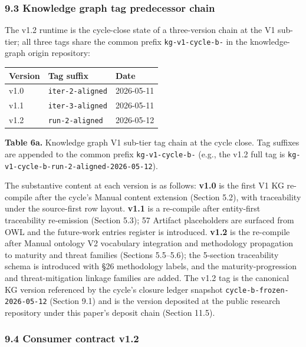 \documentclass[
]{article}
\begin{document}
\subsubsection{9.3 Knowledge graph tag predecessor
chain}\label{knowledge-graph-tag-predecessor-chain}

The v1.2 runtime is the cycle-close state of a three-version chain at
the V1 sub-tier; all three tags share the common prefix
\texttt{kg-v1-cycle-b-} in the knowledge-graph origin repository:

\begin{longtable}[]{@{}lll@{}}
\toprule\noalign{}
Version & Tag suffix & Date \\
\midrule\noalign{}
\endhead
\bottomrule\noalign{}
\endlastfoot
v1.0 & \texttt{iter-2-aligned} & 2026-05-11 \\
v1.1 & \texttt{iter-3-aligned} & 2026-05-11 \\
v1.2 & \texttt{run-2-aligned} & 2026-05-12 \\
\end{longtable}

\textbf{Table 6a.} Knowledge graph V1 sub-tier tag chain at the cycle
close. Tag suffixes are appended to the common prefix
\texttt{kg-v1-cycle-b-} (e.g., the v1.2 full tag is
\texttt{kg-v1-cycle-b-run-2-aligned-2026-05-12}).

The substantive content at each version is as follows: \textbf{v1.0} is
the first V1 KG re-compile after the cycle's Manual content extension
(Section 5.2), with traceability under the source-first row layout.
\textbf{v1.1} is a re-compile after entity-first traceability
re-emission (Section 5.3); 57 Artifact placeholders are surfaced from
OWL and the future-work entries register is introduced. \textbf{v1.2} is
the re-compile after Manual ontology V2 vocabulary integration and
methodology propagation to maturity and threat families (Sections
5.5--5.6); the 5-section traceability schema is introduced with §26
methodology labels, and the maturity-progression and threat-mitigation
linkage families are added. The v1.2 tag is the canonical KG version
referenced by the cycle's closure ledger snapshot
\texttt{cycle-b-frozen-2026-05-12} (Section 9.1) and is the version
deposited at the public research repository under this paper's deposit
chain (Section 11.5).

\subsubsection{9.4 Consumer contract v1.2}\label{consumer-contract-v1.2}
\end{document}
